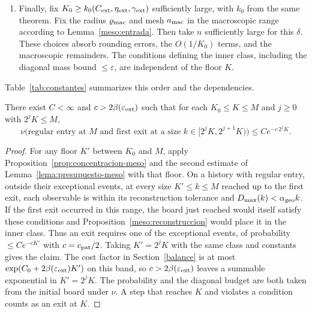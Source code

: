 \begin{enumerate}
that the deterministic entry errors and the term $C_HA\delta$ lie strictly within their tolerances, the
restriction $A(\delta+1/n)+\chi+1/K<1/4$ holds for large $n,K$, and the \emph{second} estimate of
Lemma~\ref{lema:presupuesto-meso}, for the geometric event $D_{\max}(k)\ge\alpha_{\rm geo} k$, holds with
some $\lambda>c_{\rm pat}$.
\item Finally, fix $K_0\ge k_0(C_{\rm ext},\eta_{\rm ext},\gamma_{\rm ext})$ sufficiently large, with
$k_0$ from the same theorem. Fix the radius $\varrho_{\rm mac}$ and mesh $a_{\rm mac}$ in the macroscopic
range according to Lemma~\ref{meso:entrada}. Then take $n$ sufficiently large for this $\delta$. These
choices absorb rounding errors, the $O(1/K_0)$ terms, and the macroscopic remainders. The conditions
defining the inner class, including the diagonal mass bound $\le\varepsilon$, are independent of the floor
$K$.
\end{enumerate}
Table~\ref{tab:constantes} summarizes this order and the dependencies.


\begin{proposicion}\label{prop:salida-banda-meso}
There exist $C<\infty$ and $c>2\beta(\varepsilon_{\rm ext})$ such that for each $K_0\le K\le M$ and
$j\ge0$ with $2^jK\le M$,
\[
 \nu\big(\text{regular entry at $M$ and first exit at a size }
              k\in[2^jK,2^{j+1}K)\big)
 \le C e^{-c\,2^jK}.
\]
\end{proposicion}
\begin{proof}
For any floor $K'$ between $K_0$ and $M$, apply Proposition~\ref{prop:concentracion-meso} and the second
estimate of Lemma~\ref{lema:presupuesto-meso} with that floor. On a history with regular entry, outside
their exceptional events, at every size $K'\le k\le M$ reached up to the first exit, each observable is
within its reconstruction tolerance and $D_{\max}(k)<\alpha_{\rm geo} k$. If the first exit occurred in this
range, the board just reached would itself satisfy these conditions and
Proposition~\ref{meso:reconstruccion} would place it in the inner class. Thus an exit requires one of the
exceptional events, of probability $\le Ce^{-cK'}$ with $c=c_{\rm pat}/2$. Taking $K'=2^jK$ with the same
class and constants gives the claim. The cost factor in Section~\ref{balance} is at most
$\exp(C_0+2\beta(\varepsilon_{\rm ext})K')$ on this band, so $c>2\beta(\varepsilon_{\rm ext})$ leaves a
summable exponential in $K'=2^jK$. The probability and the diagonal budget are both taken from the initial
board under $\nu$. A step that reaches $K$ and
violates a condition counts as an exit at $K$.
\end{proof}

